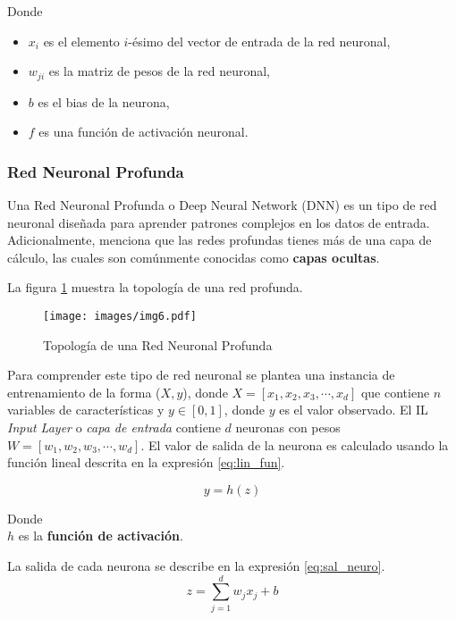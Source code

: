     Donde
    \begin{itemize}
        \item $x_i$ es el elemento $i$-ésimo del vector de entrada de la red neuronal,
        \item $w_{ji}$ es la matriz de pesos de la red neuronal,
        \item $b$ es el bias de la neurona,
        \item $f$ es una función de activación neuronal.
    \end{itemize}

    \subsubsection{Red Neuronal Profunda}

    Una Red Neuronal Profunda o Deep Neural Network (DNN) es un tipo de red neuronal diseñada para aprender patrones complejos en los datos de entrada. Adicionalmente, \citet[p. 731]{bib6} menciona que las redes profundas tienes más de una capa de cálculo, las cuales son comúnmente conocidas como \textbf{capas ocultas}.

    La figura \ref{fig:deep_red} muestra la topología de una red profunda.

    \begin{figure}[!ht]
        \centering
        \texttt{[image: images/img6.pdf]}
        \caption{Topología de una Red Neuronal Profunda}
        \label{fig:deep_red}
    \end{figure}

    Para comprender este tipo de red neuronal se plantea una instancia de entrenamiento de la forma ($X, y$), donde $X = [x_1, x_2, x_3, \cdots, x_d]$ que contiene $n$ variables de características y $y \in [0, 1]$, donde $y$ es el valor observado. El IL \textit{Input Layer} o \textit{capa de entrada} contiene $d$ neuronas con pesos $W = [w_1, w_2, w_3, \cdots, w_d]$. El valor de salida de la neurona es calculado usando la función lineal descrita en la expresión \ref{eq:lin_fun}.

    \begin{equation}
        y = h(z)
        \label{eq:lin_fun}
    \end{equation}

    Donde\\
    $h$ es la \textbf{función de activación}.

    La salida de cada neurona se describe en la expresión \ref{eq:sal_neuro}.
    \begin{equation}
        z = \sum_{j = 1}^{d}w_jx_j + b
        \label{eq:sal_neuro}
    \end{equation}

